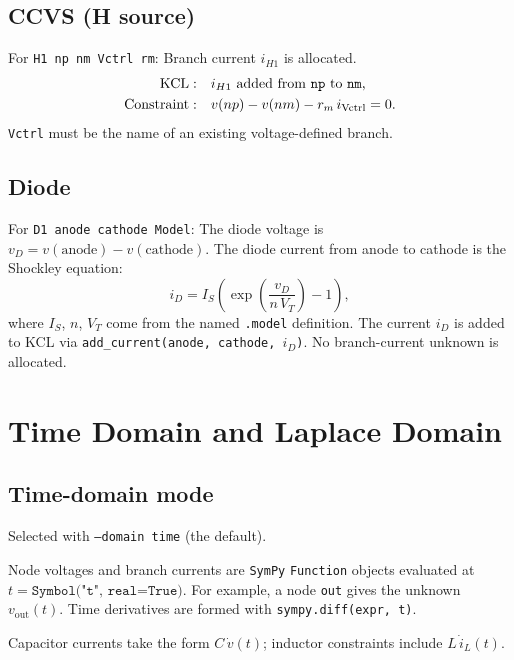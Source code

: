 \documentclass[11pt,a4paper]{article}
\newcommand{\code}[1]{\texttt{#1}}
\newcommand{\sympy}{\texttt{SymPy}}
\begin{document}
\subsection{CCVS (H source)}

For \code{H1 np nm Vctrl rm}:
Branch current \(i_{H1}\) is allocated.
\begin{align}
    \text{KCL}: & \quad i_{H1} \text{ added from \code{np} to \code{nm},} \\
    \text{Constraint}: & \quad
        v(np) - v(nm) - r_m\,i_{\mathrm{Vctrl}} = 0.
\end{align}
\code{Vctrl} must be the name of an existing voltage-defined branch.

\subsection{Diode}

For \code{D1 anode cathode Model}:
The diode voltage is \(v_D = v(\text{anode}) - v(\text{cathode})\).
The diode current from anode to cathode is the Shockley equation:
\begin{equation}
    i_D = I_S\!\left(\exp\!\left(\frac{v_D}{n\,V_T}\right) - 1\right),
\end{equation}
where \(I_S\), \(n\), \(V_T\) come from the named \code{.model} definition.
The current \(i_D\) is added to KCL via \code{add\_current(anode, cathode, \(i_D\))}.
No branch-current unknown is allocated.

\section{Time Domain and Laplace Domain}
\label{sec:domains}

\subsection{Time-domain mode}

Selected with \code{--domain time} (the default).

Node voltages and branch currents are \sympy{} \code{Function} objects evaluated at
\(t = \texttt{Symbol("t",~real=True)}\).
For example, a node \code{out} gives the unknown \(v_{\mathrm{out}}(t)\).
Time derivatives are formed with \texttt{sympy.diff(expr, t)}.

Capacitor currents take the form \(C\,\dot{v}(t)\);
inductor constraints include \(L\,\dot{i}_L(t)\).
\end{document}
